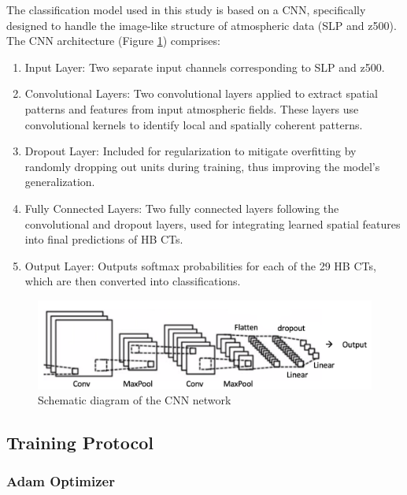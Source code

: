 \documentclass[
]{krantz}
\providecommand{\tightlist}{%
  \setlength{\itemsep}{0pt}\setlength{\parskip}{0pt}}
\begin{document}
The classification model used in this study is based on a CNN,
specifically designed to handle the image-like structure of atmospheric data (SLP and z500).
The CNN architecture (Figure \ref{fig:network}) comprises:

\begin{enumerate}
\def\labelenumi{\arabic{enumi}.}
\tightlist
\item
  Input Layer: Two separate input channels corresponding to SLP and z500.
\item
  Convolutional Layers: Two convolutional layers applied to extract spatial patterns and features from input atmospheric fields. These layers use convolutional kernels to identify local and spatially coherent patterns.
\item
  Dropout Layer: Included for regularization to mitigate overfitting by randomly dropping out units during training, thus improving the model's generalization.
\item
  Fully Connected Layers: Two fully connected layers following the convolutional and dropout layers, used for integrating learned spatial features into final predictions of HB CTs.
\item
  Output Layer: Outputs softmax probabilities for each of the 29 HB CTs, which are then converted into classifications.
\end{enumerate}

\begin{figure}

{\centering \includegraphics[width=0.7\linewidth]{work/01-weatherpattern/figures/network} 

}

\caption{Schematic diagram of the CNN network}\label{fig:network}
\end{figure}

\subsection{Training Protocol}\label{training-protocol}

\subsubsection{Adam Optimizer}\label{adam-optimizer}
\end{document}

